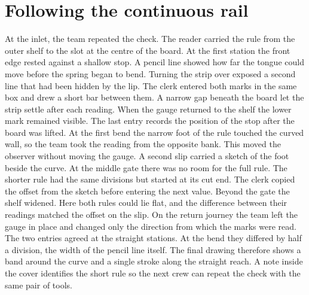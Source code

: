 \documentclass{article}
\begin{document}
\section*{Following the continuous rail}
At the inlet, the team repeated the check. The reader carried the rule from the outer shelf to the slot at the centre of the board. At the first station the front edge rested against a shallow stop. A pencil line showed how far the tongue could move before the spring began to bend. Turning the strip over exposed a second line that had been hidden by the lip. The clerk entered both marks in the same box and drew a short bar between them. A narrow gap beneath the board let the strip settle after each reading. When the gauge returned to the shelf the lower mark remained visible. The last entry records the position of the stop after the board was lifted. At the first bend the narrow foot of the rule touched the curved wall, so the team took the reading from the opposite bank. This moved the observer without moving the gauge. A second slip carried a sketch of the foot beside the curve. At the middle gate there was no room for the full rule. The shorter rule had the same divisions but started at its cut end. The clerk copied the offset from the sketch before entering the next value. Beyond the gate the shelf widened. Here both rules could lie flat, and the difference between their readings matched the offset on the slip. On the return journey the team left the gauge in place and changed only the direction from which the marks were read. The two entries agreed at the straight stations. At the bend they differed by half a division, the width of the pencil line itself. The final drawing therefore shows a band around the curve and a single stroke along the straight reach. A note inside the cover identifies the short rule so the next crew can repeat the check with the same pair of tools.
\end{document}
